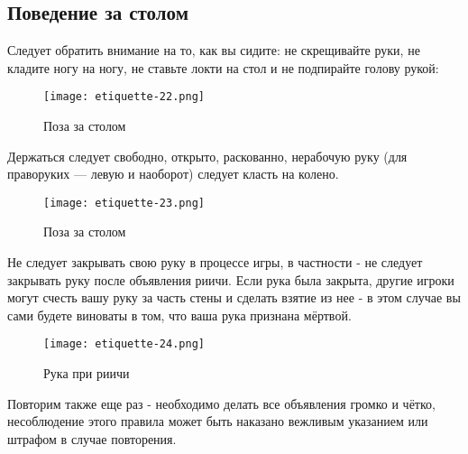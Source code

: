 \subsection{Поведение за столом}

Следует обратить внимание на то, как вы сидите: не скрещивайте руки, не кладите ногу на ногу, не ставьте локти на стол и не подпирайте голову рукой:

\begin{figure}[H]
	\centering
	\texttt{[image: etiquette-22.png]}
	\caption{Поза за столом}
\end{figure}

Держаться следует свободно, открыто, раскованно, нерабочую руку (для праворуких — левую и наоборот) следует класть на колено.

\begin{figure}[H]
	\centering
	\texttt{[image: etiquette-23.png]}
	\caption{Поза за столом}
\end{figure}

Не следует закрывать свою руку в процессе игры, в частности - не следует закрывать руку после объявления риичи. Если рука была закрыта, другие игроки могут счесть вашу руку за часть стены и сделать взятие из нее - в этом случае вы сами будете виноваты в том, что ваша рука признана мёртвой.

\begin{figure}[H]
	\centering
	\texttt{[image: etiquette-24.png]}
	\caption{Рука при риичи}
\end{figure}

Повторим также еще раз - необходимо делать все объявления громко и чётко, несоблюдение этого правила может быть наказано вежливым указанием или штрафом в случае повторения.

